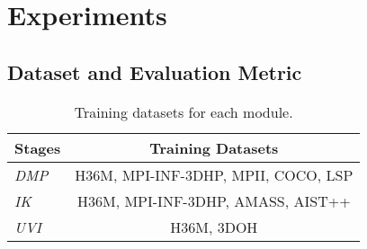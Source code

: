 \documentclass[10pt,twocolumn,letterpaper]{article}
\begin{document}
\section{Experiments}

\subsection{Dataset and Evaluation Metric}
 
\begin{table}
\begin{center}
\small
\begin{tabular}{l|c}
\hline
Stages  & Training Datasets  \\
\hline
\textit{DMP}  & H36M, MPI-INF-3DHP, MPII, COCO, LSP\\ \textit{IK}   & H36M, MPI-INF-3DHP, AMASS, AIST++     \\ \textit{UVI}   & H36M, 3DOH \\ \hline
\end{tabular}
\end{center}
\caption{Training datasets for each module.}
\label{table:traingset}
\end{table}

 
 
\end{document}
